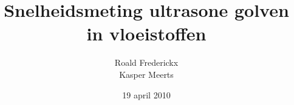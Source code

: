 \documentclass[11pt,a4paper]{article}
\author{Roald Frederickx\\Kasper Meerts}
\title{Snelheidsmeting ultrasone golven in vloeistoffen}
\date{19 april 2010}
\begin{document}
\graphicspath{{"./afbeeldingen/"}}
\maketitle







\end{document}

